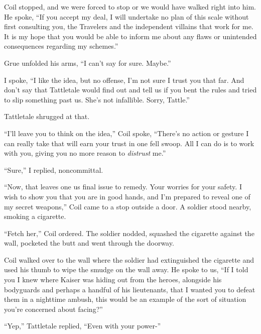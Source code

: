 Coil stopped, and we were forced to stop or we would have walked right into him.  He spoke, ``If you accept my deal, I will undertake no plan of this scale without first consulting you, the Travelers and the independent villains that work for me.  It is my hope that you would be able to inform me about any flaws or unintended consequences regarding my schemes.''



Grue unfolded his arms, ``I can't say for sure.  Maybe.''



I spoke, ``I like the idea, but no offense, I'm not sure I trust you that far.  And don't say that Tattletale would find out and tell us if you bent the rules and tried to slip something past us.  She's not infallible.  Sorry, Tattle.''



Tattletale shrugged at that.



``I'll leave you to think on the idea,'' Coil spoke, ``There's no action or gesture I can really take that will earn your trust in one fell swoop.  All I can do is to work with you, giving you no more reason to \emph{distrust} me.''



``Sure,'' I replied, noncommittal.



``Now, that leaves one us final issue to remedy.  Your worries for your safety.  I wish to show you that you are in good hands, and I'm prepared to reveal one of my secret weapons,''  Coil came to a stop outside a door.  A soldier stood nearby, smoking a cigarette.



``Fetch her,'' Coil ordered.  The soldier nodded, squashed the cigarette against the wall, pocketed the butt and went through the doorway.



Coil walked over to the wall where the soldier had extinguished the cigarette and used his thumb to wipe the smudge on the wall away.  He spoke to us, ``If I told you I knew where Kaiser was hiding out from the heroes, alongside his bodyguards and perhaps a handful of his lieutenants, that I wanted you to defeat them in a nighttime ambush, this would be an example of the sort of situation you're concerned about facing?''



``Yep,'' Tattletale replied, ``Even with your power-''



